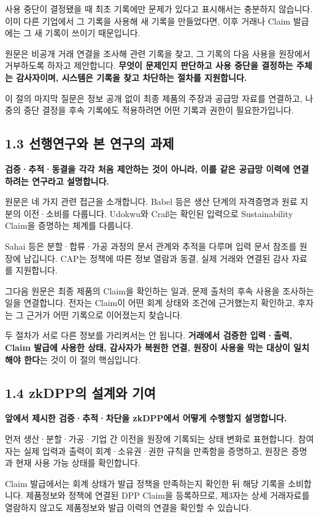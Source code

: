 사용 중단이 결정됐을 때 최초 기록에만 문제가 있다고 표시해서는 충분하지 않습니다.
이미 다른 기업에서 그 기록을 사용해 새 기록을 만들었다면, 이후 거래나 Claim 발급에는 그 새 기록이 쓰이기 때문입니다.

원문은 비공개 거래 연결을 조사해 관련 기록을 찾고, 그 기록의 다음 사용을 원장에서 거부하도록 하자고 제안합니다.
\textbf{무엇이 문제인지 판단하고 사용 중단을 결정하는 주체는 감사자이며, 시스템은 기록을 찾고 차단하는 절차를 지원합니다.}

이 절의 마지막 질문은 정보 공개 없이 최종 제품의 주장과 공급망 자료를 연결하고, 나중의 중단 결정을 후속 기록에도 적용하려면 어떤 기록과 권한이 필요한가입니다.

\subsection*{1.3 선행연구와 본 연구의 과제}
\textbf{검증·추적·동결을 각각 처음 제안하는 것이 아니라, 이를 같은 공급망 이력에 연결하려는 연구라고 설명합니다.}

원문은 네 가지 관련 접근을 소개합니다.
Babel 등은 생산 단계의 자격증명과 원료 지분의 이전·소비를 다룹니다.
Udokwu와 Craß는 확인된 입력으로 Sustainability Claim을 증명하는 체계를 다룹니다.

Sahai 등은 분할·합류·가공 과정의 문서 관계와 추적을 다루며 입력 문서 참조를 원장에 남깁니다.
CAP는 정책에 따른 정보 열람과 동결, 실제 거래와 연결된 감사 자료를 지원합니다.

그다음 원문은 최종 제품의 Claim을 확인하는 일과, 문제 출처의 후속 사용을 조사하는 일을 연결합니다.
전자는 Claim이 어떤 회계 상태와 조건에 근거했는지 확인하고, 후자는 그 근거가 어떤 기록으로 이어졌는지 찾습니다.

두 절차가 서로 다른 정보를 가리켜서는 안 됩니다.
\textbf{거래에서 검증한 입력·출력, Claim 발급에 사용한 상태, 감사자가 복원한 연결, 원장이 사용을 막는 대상이 일치해야 한다}는 것이 이 절의 핵심입니다.

\subsection*{1.4 zkDPP의 설계와 기여}
\textbf{앞에서 제시한 검증·추적·차단을 zkDPP에서 어떻게 수행할지 설명합니다.}

먼저 생산·분할·가공·기업 간 이전을 원장에 기록되는 상태 변화로 표현합니다.
참여자는 실제 입력과 출력이 회계·소유권·권한 규칙을 만족함을 증명하고, 원장은 증명과 현재 사용 가능 상태를 확인합니다.

Claim 발급에서는 회계 상태가 발급 정책을 만족하는지 확인한 뒤 해당 기록을 소비합니다.
제품정보와 정책에 연결된 DPP Claim을 등록하므로, 제3자는 상세 거래자료를 열람하지 않고도 제품정보와 발급 이력의 연결을 확인할 수 있습니다.

